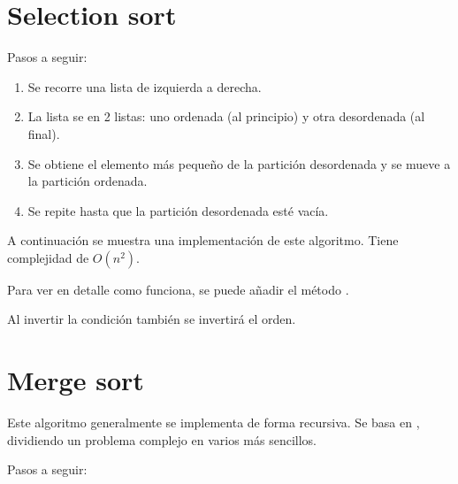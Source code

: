 
\section{Selection sort}

Pasos a seguir:

\begin{enumerate}
  \item Se recorre una lista de izquierda a derecha.
  
  \item La lista se  en 2 listas: uno ordenada (al principio) y otra desordenada (al final).

  \item Se obtiene el elemento más pequeño de la partición desordenada y se mueve a la partición ordenada.
  
  \item Se repite hasta que la partición desordenada esté vacía.
  
\end{enumerate}

A continuación se muestra una implementación de este algoritmo.
Tiene complejidad de $O(n^2)$.


Para ver en detalle como funciona, se puede añadir el método .


Al invertir la condición también se invertirá el orden.



\section{Merge sort}

Este algoritmo generalmente se implementa de forma recursiva.
Se basa en , dividiendo un problema complejo en varios más sencillos.

Pasos a seguir:

